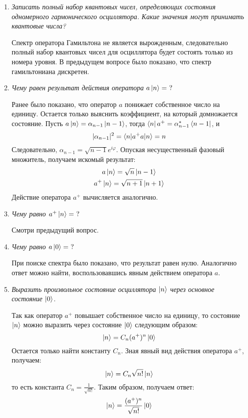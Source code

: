 \documentclass{article}
\begin{document}
\begin{enumerate}
	\item \textit{Записать полный набор квантовых чисел, определяющих состояния одномерного гармонического осциллятора. Какие значения могут принимать квантовые числа?}
	
	Спектр оператора Гамильтона не является вырожденным, следовательно полный набор квантовых чисел для осциллятора будет состоять только из номера уровня. В предыдущем вопросе было показано, что спектр гамильтониана дискретен.
	
	\item \textit{Чему равен результат действия оператора $a\ket{n} = \ ?$}
	
	Ранее было показано, что оператор $a$ понижает собственное число на единицу. Остается только выяснить коэффициент, на который домножается состояние. Пусть $a\ket{n} = \alpha_{n-1}\ket{n-1}$, тогда $\bra{n}a^+ = \alpha^*_{n-1}\bra{n-1}$, и
	\begin{equation}
		|\alpha_{n-1}|^2 = \braket{n|a^+a|n} = n
	\end{equation}
	Следовательно, $\alpha_{n-1} = \sqrt{n-1}e^{i\varphi}$. Опуская несущественный фазовый множитель, получаем искомый результат:
	\begin{gather}
		a\ket{n} = \sqrt{n}\ket{n-1} \\
		a^+\ket{n} = \sqrt{n+1} \ket{n+1}
	\end{gather}
	Действие оператора $a^+$ вычисляется аналогично.
	\item \textit{ Чему равно $a^+\ket{n} = \ ?$}
	
	Смотри предыдущий вопрос.
	\item \textit{Чему равно $a\ket{0} = \ ?$}
	
	При поиске спектра было показано, что результат равен нулю. Аналогично ответ можно найти, воспользовавшись явным действием оператора $a$.
	\item \textit{Выразить произвольное состояние осциллятора $\ket{n}$ через основное состояние $\ket{0}$.}
	
	Так как оператор $a^+$ повышает собственное число на единицу, то состояние $\ket{n}$ можно выразить через состояние $\ket{0}$ следующим образом:
	\begin{equation}
		\ket{n} = C_n (a^+)^n \ket{0}
	\end{equation}
	Остается только найти константу $C_n$. Зная явный вид действия оператора $a^+$, получаем:
	\begin{equation}
		\ket{n} = C_n \sqrt{n!}\ket{n}
	\end{equation}
	то есть константа $C_n = \frac{1}{\sqrt{n!}}$. Таким образом, получаем ответ:
	\begin{equation}
		\ket{n} = \frac{(a^+)^n}{\sqrt{n!}}\ket{0}
	\end{equation}
	

\end{enumerate}
\end{document}
